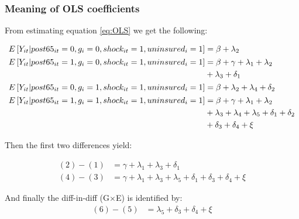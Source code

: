 \documentclass[10pt,compress,xcolor=dvipsnames,aspectratio=169]{beamer}    %
\newcommand{\1}[1]{\mathrm{1\hspace*{-2.5pt}l}[#1]}	%
\begin{document}
\begin{frame}
\frametitle{Meaning of OLS coefficients} \label{frame:OLSmath}
From estimating equation \ref{eq:OLS} we get the following:
\hyperlink{fig:maincoeffplot}{}

\begin{footnotesize}
\begin{align}
\phantom{E\left[ Y_{it}| post65_{it}=1, g_i=1, shock_{it}=1,uninsured_i=1\right]}
&\begin{aligned}
	\mathllap{E\left[ Y_{it}| post65_{it}=0, g_i=0, shock_{it}=1,uninsured_i=1\right]} &=\beta+\lambda_2
\end{aligned}\\
&\begin{aligned}
	\mathllap{E\left[ Y_{it}| post65_{it}=1, g_i=0, shock_{it}=1,uninsured_i=1\right]} &=\beta+\gamma+\lambda_1+\lambda_2\\ &+\lambda_3+\delta_1
\end{aligned}\\
&\begin{aligned}
	\mathllap{E\left[ Y_{it}| post65_{it}=0, g_i=1, shock_{it}=1,uninsured_i=1\right]} &=\beta+\lambda_2+\lambda_4+\delta_2
\end{aligned}\\
&\begin{aligned}
	\mathllap{E\left[ Y_{it}| post65_{it}=1, g_i=1, shock_{it}=1,uninsured_i=1\right]} &=\beta+\gamma+\lambda_1+\lambda_2\\
	&+\lambda_3+\lambda_4+\lambda_5+\delta_1+\delta_2\\
	&+\delta_3+\delta_4+\xi
\end{aligned}
\end{align}

Then the first two differences yield:

\begin{align}
(2)-(1)&=\gamma+\lambda_1+\lambda_3+\delta_1\\
(4)-(3)&=\gamma+\lambda_1+\lambda_3+\lambda_5+\delta_1+\delta_3+\delta_4+\xi
\end{align}

And finally the diff-in-diff (G$\times$E) is identified by:
\begin{align}
	(6)-(5)&=\lambda_5+\delta_3+\delta_4+\xi
\end{align}
\end{footnotesize}

\end{frame}
\end{document}
